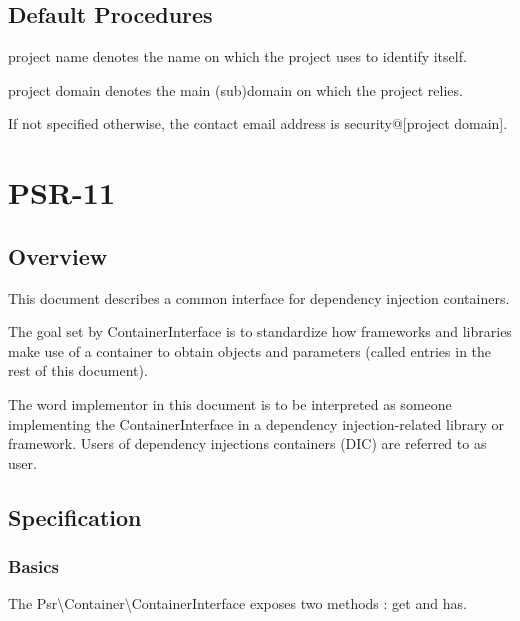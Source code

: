 \section{Default Procedures}

\begin{compactitem}
\item [project name] denotes the name on which the project uses to identify itself.
\item [project domain] denotes the main (sub)domain on which the project relies.
\end{compactitem}

If not specified otherwise, the contact email address is security@[project domain].

\chapter{PSR-11}

\section{Overview}

This document describes a common interface for dependency injection containers.

The goal set by ContainerInterface is to standardize how frameworks and libraries make use of a container to obtain objects and parameters (called entries in the rest of this document).

The word implementor in this document is to be interpreted as someone implementing the ContainerInterface in a dependency injection-related library or framework. Users of dependency injections containers (DIC) are referred to as user.

\section{Specification}


\subsection{Basics}

The Psr\textbackslash Container\textbackslash ContainerInterface exposes two methods : get and has.

